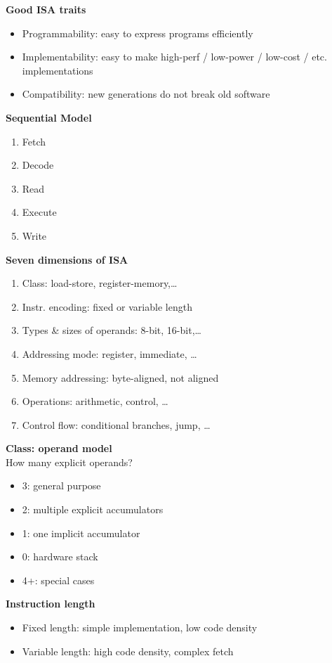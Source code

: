 \documentclass[10pt,letterpaper,landscape]{report}
\newcommand{\boxheight}{21.59cm}
\newcommand{\boxwidth}{8.85cm}
\begin{document}
\begin{small}
{\begin{minipage}[t][\boxheight][c]{\boxwidth}
    \textbf{Good ISA traits}
    \begin{itemize}
        \item Programmability: easy to express programs efficiently
        \item Implementability: easy to make high-perf / low-power / low-cost / etc. implementations
        \item Compatibility: new generations do not break old software
    \end{itemize}
    
    \textbf{Sequential Model}
    \begin{enumerate}
        \item Fetch
        \item Decode
        \item Read
        \item Execute
        \item Write
    \end{enumerate}
    
    \textbf{Seven dimensions of ISA}
    \begin{enumerate}
        \item Class: load-store, register-memory,\dots
        \item Instr. encoding: fixed or variable length
        \item Types \& sizes of operands: 8-bit, 16-bit,\dots
        \item Addressing mode: register, immediate, \dots
        \item Memory addressing: byte-aligned, not aligned
        \item Operations: arithmetic, control, \dots
        \item Control flow: conditional branches, jump, \dots
    \end{enumerate}
    
    \textbf{Class: operand model}\\
    How many explicit operands?
    \begin{itemize}
        \item 3: general purpose
        \item 2: multiple explicit accumulators
        \item 1: one implicit accumulator
        \item 0: hardware stack
        \item 4+: special cases
    \end{itemize}
    
    \textbf{Instruction length}
    \begin{itemize}
        \item Fixed length: simple implementation, low code density
        \item Variable length: high code density, complex fetch
    \end{itemize}
    


\end{minipage}}
\end{small}
\end{document}
